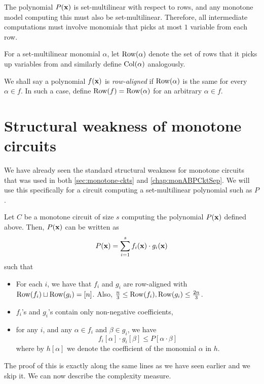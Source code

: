 The polynomial $P(\mathbf{x})$ is set-multilinear with respect to rows, and any monotone model computing this must also be set-multilinear. Therefore, all intermediate computations must involve monomials that picks at most $1$ variable from each row.

For a set-multilinear monomial $\alpha$, let $\operatorname{Row}(\alpha)$ denote the set of rows that it picks up variables from and similarly define $\operatorname{Col}(\alpha)$ analogously.

We shall say a polynomial $f(\mathbf{x})$ is \emph{row-aligned} if $\operatorname{Row}(\alpha)$ is the same for every $\alpha \in f$. In such a case, define $\operatorname{Row}(f) = \operatorname{Row}(\alpha)$ for an arbitrary $\alpha \in f$. \\


\section{Structural weakness of monotone circuits}

We have already seen the standard structural weakness for monotone circuits that was used in both \autoref{sec:monotone-ckts} and \autoref{chap:monABPCktSep}. We will use this specifically for a circuit computing a set-multilinear polynomial such as $P$.

\begin{lemma}\label{lem:monVPVNP:structure}
  Let $C$ be a monotone circuit of size $s$ computing the polynomial $P(\mathbf{x})$ defined above. Then, $P(\mathbf{x})$ can be written as
  \begin{equation}\label{eqn:monVPVNP-main}
    P(\mathbf{x}) = \sum_{i=1}^s f_i(\mathbf{x}) \cdot g_i(\mathbf{x})
  \end{equation}
  such that
  \begin{itemize}\itemsep 0pt
  \item For each $i$, we have that $f_i$ and $g_i$ are row-aligned with
    $\operatorname{Row}(f_i) \sqcup \operatorname{Row}(g_i) = [n]$. Also, $\frac{n}{3} \leq \operatorname{Row}(f_i), \operatorname{Row}(g_i) \leq \frac{2n}{3}$.
  \item $f_i$'s and $g_i$'s contain only non-negative coefficients,
  \item for any $i$, and any $\alpha \in f_i$ and $\beta\in g_i$, we have
    \[
      f_i[\alpha]\cdot g_i[\beta] \leq P[\alpha \cdot \beta]
    \]
    where by $h[\alpha]$ we denote the coefficient of the monomial $\alpha$ in $h$.
  \end{itemize}
\end{lemma}

\noindent
The proof of this is exactly along the same lines as we have seen earlier and we skip it. We can now describe the complexity measure.

